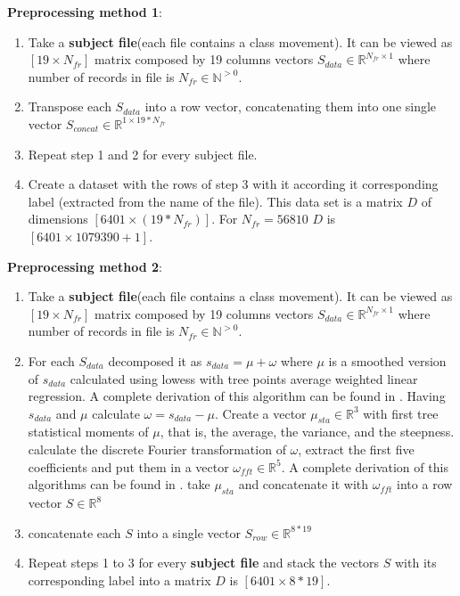 \textbf{Preprocessing method 1}:
\begin{enumerate}
	\item Take a \textbf{subject file}(each file contains a class movement). It can be viewed as $[19 \times N_{fr}]$ matrix composed by 19 columns vectors $S_{data} \in \mathbb{R}^{N_{fr} \times 1}$  where number of records in file is $N_{fr} \in \mathbb{N}^{>0}$.
	\item Transpose each $S_{data}$ into a row vector, concatenating them into one single vector $S_{concat} \in  \mathbb{R}^{1 \times 19*N_{fr} }$
	\item Repeat step 1 and 2 for every subject file.
	\item Create a dataset with the rows of step 3 with it according it corresponding label (extracted from the name of the file). This data set is a matrix $D$ of dimensions $[6401 \times (19*N_{fr})]$. For $N_{fr}=56810$ $D$ is $[6401 \times 1079390+1]$.
\end{enumerate}

\textbf{Preprocessing method 2}:
\begin{enumerate}
	\item Take a \textbf{subject file}(each file contains a class movement). It can be viewed as $[19 \times N_{fr}]$ matrix composed by 19 columns vectors $S_{data} \in \mathbb{R}^{N_{fr} \times 1}$  where number of records in file is $N_{fr} \in \mathbb{N}^{>0}$.
	\item For each $S_{data}$ decomposed it as $s_{data}=\mu+\omega$ where $\mu$ is a smoothed version of $s_{data}$ calculated using lowess with tree points average weighted linear regression. A complete derivation of this algorithm can be found in \cite{1}. Having $s_{data}$ and $\mu$ calculate $\omega =s_{data}-\mu$. Create a vector $\mu_{sta} \in \mathbb{R}^{3}$ with first tree statistical moments of $\mu$, that is, the average, the variance, and the steepness. calculate the discrete Fourier transformation of $\omega$, extract the first five coefficients and put them in a vector $\omega_{fft} \in \mathbb{R}^{5}$. A complete derivation of this algorithms can be found in \cite{2}.
	take $\mu_{sta}$ and concatenate it with $\omega_{fft}$ into a row vector $S \in \mathbb{R}^{8}$
	\item concatenate each $S$ into a single vector $S_{row} \in \mathbb{R}^{8*19}$
	\item Repeat steps 1 to 3 for every \textbf{subject file} and stack the vectors $S$ with its corresponding label into a matrix $D$ is $[6401 \times 8*19]$.
\end{enumerate}

